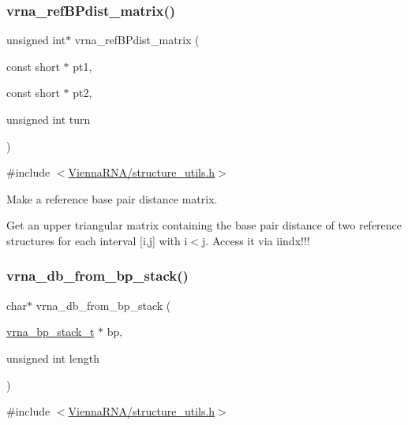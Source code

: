 \subsubsection{\texorpdfstring{vrna\+\_\+ref\+B\+Pdist\+\_\+matrix()}{vrna\_refBPdist\_matrix()}}
{\footnotesize\ttfamily unsigned int$\ast$ vrna\+\_\+ref\+B\+Pdist\+\_\+matrix (\begin{DoxyParamCaption}\item[{const short $\ast$}]{pt1,  }\item[{const short $\ast$}]{pt2,  }\item[{unsigned int}]{turn }\end{DoxyParamCaption})}



{\ttfamily \#include $<$\hyperlink{structure__utils_8h}{Vienna\+R\+N\+A/structure\+\_\+utils.\+h}$>$}



Make a reference base pair distance matrix. 

Get an upper triangular matrix containing the base pair distance of two reference structures for each interval \mbox{[}i,j\mbox{]} with i$<$j. Access it via iindx!!! \mbox{\label{group__struct__utils_ga27bea2c241564af53a065982183389df}} 
\subsubsection{\texorpdfstring{vrna\+\_\+db\+\_\+from\+\_\+bp\+\_\+stack()}{vrna\_db\_from\_bp\_stack()}}
{\footnotesize\ttfamily char$\ast$ vrna\+\_\+db\+\_\+from\+\_\+bp\+\_\+stack (\begin{DoxyParamCaption}\item[{\hyperlink{group__data__structures_gaa651bda42e7692f08cb603cd6834b0ee}{vrna\+\_\+bp\+\_\+stack\+\_\+t} $\ast$}]{bp,  }\item[{unsigned int}]{length }\end{DoxyParamCaption})}



{\ttfamily \#include $<$\hyperlink{structure__utils_8h}{Vienna\+R\+N\+A/structure\+\_\+utils.\+h}$>$}



